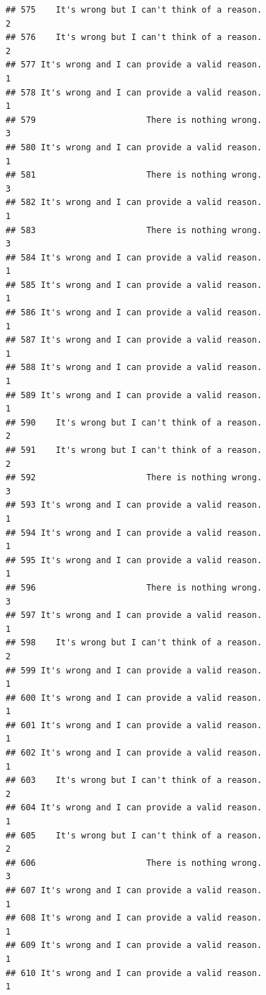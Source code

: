 \documentclass[
  american,
  man,floatsintext]{apa7}
\begin{document}
\begin{verbatim}
## 575    It's wrong but I can't think of a reason.                    2
## 576    It's wrong but I can't think of a reason.                    2
## 577 It's wrong and I can provide a valid reason.                    1
## 578 It's wrong and I can provide a valid reason.                    1
## 579                      There is nothing wrong.                    3
## 580 It's wrong and I can provide a valid reason.                    1
## 581                      There is nothing wrong.                    3
## 582 It's wrong and I can provide a valid reason.                    1
## 583                      There is nothing wrong.                    3
## 584 It's wrong and I can provide a valid reason.                    1
## 585 It's wrong and I can provide a valid reason.                    1
## 586 It's wrong and I can provide a valid reason.                    1
## 587 It's wrong and I can provide a valid reason.                    1
## 588 It's wrong and I can provide a valid reason.                    1
## 589 It's wrong and I can provide a valid reason.                    1
## 590    It's wrong but I can't think of a reason.                    2
## 591    It's wrong but I can't think of a reason.                    2
## 592                      There is nothing wrong.                    3
## 593 It's wrong and I can provide a valid reason.                    1
## 594 It's wrong and I can provide a valid reason.                    1
## 595 It's wrong and I can provide a valid reason.                    1
## 596                      There is nothing wrong.                    3
## 597 It's wrong and I can provide a valid reason.                    1
## 598    It's wrong but I can't think of a reason.                    2
## 599 It's wrong and I can provide a valid reason.                    1
## 600 It's wrong and I can provide a valid reason.                    1
## 601 It's wrong and I can provide a valid reason.                    1
## 602 It's wrong and I can provide a valid reason.                    1
## 603    It's wrong but I can't think of a reason.                    2
## 604 It's wrong and I can provide a valid reason.                    1
## 605    It's wrong but I can't think of a reason.                    2
## 606                      There is nothing wrong.                    3
## 607 It's wrong and I can provide a valid reason.                    1
## 608 It's wrong and I can provide a valid reason.                    1
## 609 It's wrong and I can provide a valid reason.                    1
## 610 It's wrong and I can provide a valid reason.                    1

\end{verbatim}
\end{document}
